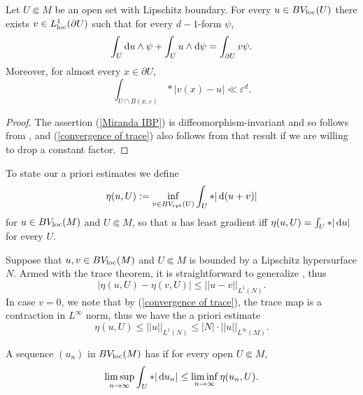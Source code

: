 \begin{proposition}\label{traces}
Let $U \Subset M$ be an open set with Lipschitz boundary.
For every $u \in BV_{\mathrm{loc}}(U)$ there exists $v \in L^1_{\mathrm{loc}}(\partial U)$ such that for every $d-1$-form $\psi$,
\begin{equation}\label{Miranda IBP}
\int_U \mathop{}\!\mathrm{d} u \wedge \psi + \int_U u \wedge \mathop{}\!\mathrm{d} \psi = \int_{\partial U} v\psi.
\end{equation}
Moreover, for almost every $x \in \partial U$,
\begin{equation}\label{convergence of trace}
\int_{U \cap B(x, \varepsilon)} *|v(x) - u| \ll \varepsilon^d.
\end{equation}
\end{proposition}
\begin{proof}
The assertion (\ref{Miranda IBP}) is diffeomorphism-invariant and so follows from \cite[Teorema 1]{Miranda67}, and (\ref{convergence of trace}) also follows from that result if we are willing to drop a constant factor.
\end{proof}

To state our a priori estimates we define
$$\eta(u, U) := \inf_{v \in BV_{\mathrm{cpt}}(U)} \int_U *|\mathop{}\!\mathrm{d}(u + v)|$$
for $u \in BV_{\mathrm{loc}}(M)$ and $U \Subset M$, so that $u$ has least gradient iff $\eta(u, U) = \int_U *|\mathop{}\!\mathrm{d} u|$ for every $U$.

Suppose that $u, v \in BV_{\mathrm{loc}}(M)$ and $U \Subset M$ is bounded by a Lipschitz hypersurface $N$. Armed with the trace theorem, it is straightforward to generalize \cite[Lemma 5.6]{Giusti77}, thus
\begin{equation}
|\eta(u, U) - \eta(v, U)| \leq ||u - v||_{L^1(N)}. \label{a priori estimate 1}
\end{equation}
In case $v = 0$, we note that by (\ref{convergence of trace}), the trace map is a contraction in $L^\infty$ norm, thus we have the a priori estimate
\begin{equation}
\eta(u, U) \leq ||u||_{L^1(N)} \leq |N| \cdot ||u||_{L^\infty(M)}. \label{a priori estimate 2}
\end{equation}

\begin{definition}
A sequence $(u_n)$ in $BV_{\mathrm{loc}}(M)$ has  if for every open $U \Subset M$,
$$\limsup_{n \to \infty} \int_U *|\mathop{}\!\mathrm{d} u_n| \leq \liminf_{n \to \infty} \eta(u_n, U).$$
\end{definition}

